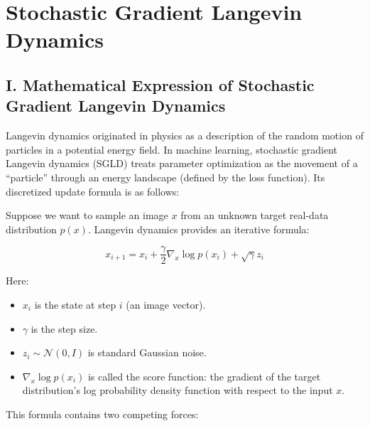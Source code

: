 \setcounter{section}{1}

\hypertarget{stochastic-gradient-langevin-dynamics}{%
\section{Stochastic Gradient Langevin Dynamics}\label{stochastic-gradient-langevin-dynamics}}

\hypertarget{i.-mathematical-expression-of-stochastic-gradient-langevin-dynamics}{%
\subsection{I. Mathematical Expression of Stochastic Gradient Langevin Dynamics}\label{i.-mathematical-expression-of-stochastic-gradient-langevin-dynamics}}

Langevin dynamics originated in physics as a description of the random motion of particles in a potential energy field. In machine learning, stochastic gradient Langevin dynamics (SGLD) treats parameter optimization as the movement of a ``particle'' through an energy landscape (defined by the loss function). Its discretized update formula is as follows:

Suppose we want to sample an image \(x\) from an unknown target real-data distribution \(p(x)\). Langevin dynamics provides an iterative formula:

\[
x_{i+1}=x_i+\frac{\gamma}{2}\nabla_x\log p(x_i)+\sqrt{\gamma}z_i
\]

Here:

\begin{itemize}
\tightlist
\item
  \(x_i\) is the state at step \(i\) (an image vector).
\item
  \(\gamma\) is the step size.
\item
  \(z_i\sim\mathcal{N}(0,I)\) is standard Gaussian noise.
\item
  \(\nabla_x\log p(x_i)\) is called the score function: the gradient of the target distribution's log probability density function with respect to the input \(x\).
\end{itemize}

This formula contains two competing forces:

